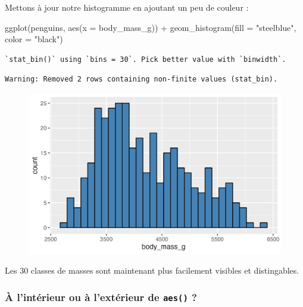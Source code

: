 \documentclass[
  letterpaper,
  DIV=11,
  numbers=noendperiod]{scrreprt}
\newenvironment{Shaded}{\begin{snugshade}}{\end{snugshade}}
\newcommand{\AttributeTok}[1]{\textcolor[rgb]{0.40,0.45,0.13}{#1}}
\newcommand{\FunctionTok}[1]{\textcolor[rgb]{0.28,0.35,0.67}{#1}}
\newcommand{\NormalTok}[1]{\textcolor[rgb]{0.00,0.23,0.31}{#1}}
\newcommand{\SpecialCharTok}[1]{\textcolor[rgb]{0.37,0.37,0.37}{#1}}
\newcommand{\StringTok}[1]{\textcolor[rgb]{0.13,0.47,0.30}{#1}}
\begin{document}
Mettons à jour notre histogramme en ajoutant un peu de couleur :

\begin{Shaded}
\begin{Highlighting}[]
\FunctionTok{ggplot}\NormalTok{(penguins, }\FunctionTok{aes}\NormalTok{(}\AttributeTok{x =}\NormalTok{ body\_mass\_g)) }\SpecialCharTok{+}
  \FunctionTok{geom\_histogram}\NormalTok{(}\AttributeTok{fill =} \StringTok{"steelblue"}\NormalTok{, }\AttributeTok{color =} \StringTok{"black"}\NormalTok{)}
\end{Highlighting}
\end{Shaded}

\begin{verbatim}
`stat_bin()` using `bins = 30`. Pick better value with `binwidth`.
\end{verbatim}

\begin{verbatim}
Warning: Removed 2 rows containing non-finite values (stat_bin).
\end{verbatim}

\begin{figure}[H]

{\centering \includegraphics{./03-visualization_files/figure-pdf/unnamed-chunk-10-1.png}

}

\end{figure}

Les 30 classes de masses sont maintenant plus facilement visibles et
distingables.

\hypertarget{uxe0-lintuxe9rieur-ou-uxe0-lextuxe9rieur-de-aes}{%
\subsubsection{\texorpdfstring{À l'intérieur ou à l'extérieur de
\texttt{aes()}
?}{À l'intérieur ou à l'extérieur de aes() ?}}\label{uxe0-lintuxe9rieur-ou-uxe0-lextuxe9rieur-de-aes}}
\end{document}
